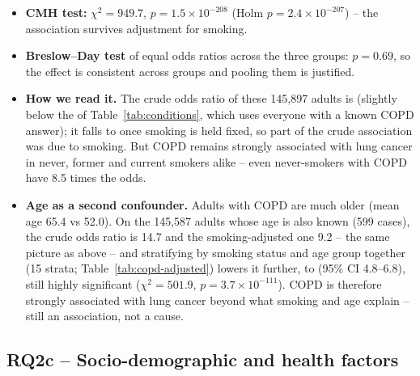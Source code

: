 \begin{table}[htbp]
\centering\small
\caption{COPD and lung cancer, stratified by smoking status (adults with known COPD and smoking status).}\label{tab:copd-smoking}

\end{table}

\begin{itemize}
  \item \textbf{CMH test:} $\chi^2 = 949.7$, $p = 1.5 \times 10^{-208}$ (Holm $p = 2.4 \times 10^{-207}$) -- the association survives adjustment for smoking.
  \item \textbf{Breslow--Day test} of equal odds ratios across the three groups: $p = 0.69$, so the effect is consistent across groups and pooling them is justified.
  \item \textbf{How we read it.} The crude odds ratio of these 145,897 adults is \orCOPDcrude (slightly below the \orCOPD of Table~\ref{tab:conditions}, which uses everyone with a known COPD answer); it falls to \orCOPDsmoking once smoking is held fixed, so part of the crude association was due to smoking. But COPD remains strongly associated with lung cancer in never, former and current smokers alike -- even never-smokers with COPD have 8.5 times the odds.
  \item \textbf{Age as a second confounder.} Adults with COPD are much older (mean age 65.4 vs 52.0). On the 145,587 adults whose age is also known (599 cases), the crude odds ratio is 14.7 and the smoking-adjusted one 9.2 -- the same picture as above -- and stratifying by smoking status and age group together (15 strata; Table~\ref{tab:copd-adjusted}) lowers it further, to \orCOPDsmokingAge (95\% CI 4.8--6.8), still highly significant ($\chi^2 = 501.9$, $p = 3.7 \times 10^{-111}$). COPD is therefore strongly associated with lung cancer beyond what smoking and age explain -- still an association, not a cause.
\end{itemize}

\begin{table}[htbp]
\centering\small
\caption{COPD odds ratio under increasing adjustment (the 145,587 adults with known COPD, smoking status and age; 599 cases). Source: \texttt{copd\_adjusted.csv}.}\label{tab:copd-adjusted}

\end{table}

\subsection{RQ2c -- Socio-demographic and health factors}\label{sec:sociodemo}

